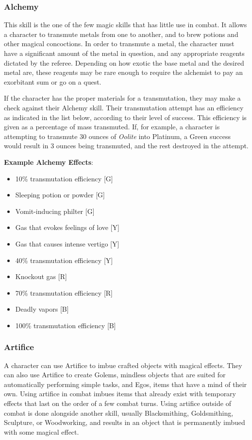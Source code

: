 \documentclass[oneside]{book}
\begin{document}
\begin{multicols}{2}
\subsubsection{Alchemy}
This skill is the one of the few magic skills that has little use in combat. It allows a character to transmute metals from one to another, and to brew potions and other magical concoctions. In order to transmute a metal, the character must have a significant amount of the metal in question, and any appropriate reagents dictated by the referee. Depending on how exotic the base metal and the desired metal are, these reagents may be rare enough to require the alchemist to pay an exorbitant sum or go on a quest.

If the character has the proper materials for a transmutation, they may make a check against their Alchemy skill. Their transmutation attempt has an efficiency as indicated in the list below, according to their level of success. This efficiency is given as a percentage of mass transmuted. If, for example, a character is attempting to transmute 30 ounces of \emph{Oolite} into Platinum, a Green success would result in 3 ounces being transmuted, and the rest destroyed in the attempt. 

\textbf{Example Alchemy Effects}: 
	\begin{itemize}
		\setlength{\itemsep}{0cm}%
  		\setlength{\parskip}{0cm}%
		\item{ \small 10\% transmutation efficiency [G]}
		\item{ \small Sleeping potion or powder [G]}
		\item{ \small Vomit-inducing philter [G]}
		\item{ \small Gas that evokes feelings of love [Y]}
		\item{ \small Gas that causes intense vertigo [Y]}
		\item{ \small 40\% transmutation efficiency [Y]}
		\item{ \small Knockout gas [R]}
		\item{ \small 70\% transmutation efficiency [R]}
		\item{ \small Deadly vapors [B]}
		\item{ \small 100\% transmutation efficiency [B]}
	\end{itemize}

\subsubsection{Artifice}
A character can use Artifice to imbue crafted objects with magical effects. They can also use Artifice to create Golems, mindless objects that are suited for automatically performing simple tasks, and Egos, items that have a mind of their own. Using artifice in combat imbues items that already exist with temporary effects that last on the order of a few combat turns. Using artifice outside of combat is done alongside another skill, usually Blacksmithing, Goldsmithing, Sculpture, or Woodworking, and results in an object that is permanently imbued with some magical effect.


\end{multicols}
\end{document}
